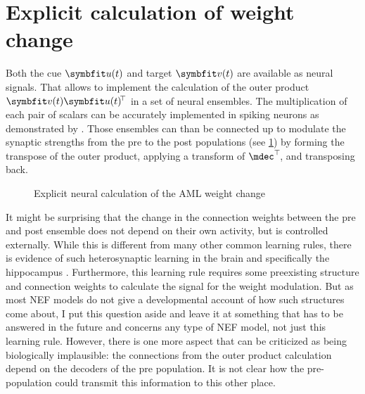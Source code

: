 \section{Explicit calculation of weight change}
Both the cue $\vc u(t)$ and target $\vc v(t)$ are available as neural signals.
That allows to implement the calculation of the outer product $\vc v(t) \vc u(t)\!\Tr$ in a set of neural ensembles.
The multiplication of each pair of scalars can be accurately implemented in spiking neurons as demonstrated by \textcite{gosmann2015-1}.
Those ensembles can than be connected up to modulate the synaptic strengths from the pre to the post populations (see \cref{fig:aml-explicit}) by forming the transpose of the outer product, applying a transform of $\mdec\Tr\!$, and transposing back.
\begin{figure}
    \centering
    \caption{Explicit neural calculation of the AML weight change}\label{fig:aml-explicit}
\end{figure}

It might be surprising that the change in the connection weights between the pre and post ensemble does not depend on their own activity, but is controlled externally.
While this is different from many other common learning rules, there is evidence of such heterosynaptic learning in the brain and specifically the hippocampus \parencite{huilme2014,rebola2017,uchida2012}.
Furthermore, this learning rule requires some preexisting structure and connection weights to calculate the signal for the weight modulation.
But as most NEF models do not give a developmental account of how such structures come about, I put this question aside and leave it at something that has to be answered in the future and concerns any type of NEF model, not just this learning rule.
However, there is one more aspect that can be criticized as being biologically implausible: the connections from the outer product calculation depend on the decoders of the pre population.
It is not clear how the pre-population could transmit this information to this other place.

